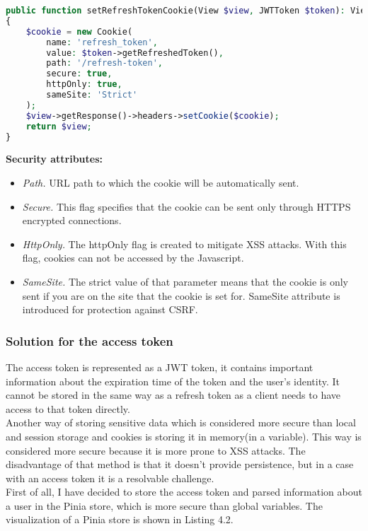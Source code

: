 \begin{lstlisting}[language=PHP, caption=Cookies setting on server]
public function setRefreshTokenCookie(View $view, JWTToken $token): View
{
    $cookie = new Cookie(
        name: 'refresh_token',
        value: $token->getRefreshedToken(),
        path: '/refresh-token',
        secure: true,
        httpOnly: true,
        sameSite: 'Strict'
    );
    $view->getResponse()->headers->setCookie($cookie);
    return $view;
}
\end{lstlisting}

\noindent \textbf{Security attributes: \cite{cookies-flags}}

\begin{itemize}
    \item \emph{Path.} URL path to which the cookie will be automatically sent.
    \item \emph{Secure.} This flag specifies that the cookie can be sent only through HTTPS encrypted connections.
    \item \emph{HttpOnly.} The httpOnly flag is created to mitigate XSS attacks. With this flag, cookies can not be accessed by the Javascript.
    \item \emph{SameSite.} The strict value of that parameter means that the cookie is only sent if you are on the site that the cookie is set for. SameSite attribute is introduced for protection against CSRF. 
\end{itemize}


\subsubsection{Solution for the access token} The access token is represented as a JWT token, it contains important information about the expiration time of the token and the user's identity. It cannot be stored in the same way as a refresh token as a client needs to have access to that token directly.\\
Another way of storing sensitive data which is considered more secure than local and session storage and cookies is storing it in memory(in a variable). This way is considered more secure because it is more prone to XSS attacks. The disadvantage of that method is that it doesn't provide persistence, but in a case with an access token it is a resolvable challenge.\\
First of all, I have decided to store the access token and parsed information about a user in the Pinia store, which is more secure than global variables. The visualization of a Pinia store is shown in Listing 4.2.

